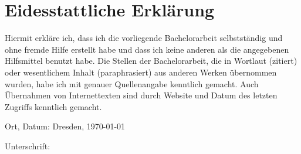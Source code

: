 \chapter*{Eidesstattliche Erklärung}

Hiermit erkläre ich, dass ich die vorliegende Bachelorarbeit selbstständig und ohne fremde Hilfe erstellt habe und dass ich keine anderen als die angegebenen Hilfsmittel benutzt habe. Die Stellen der Bachelorarbeit, die in Wortlaut (zitiert) oder wesentlichem Inhalt (paraphrasiert) aus anderen Werken übernommen wurden, habe ich mit genauer Quellenangabe kenntlich gemacht. Auch Übernahmen von Internettexten sind durch Website und Datum des letzten Zugriffs kenntlich gemacht.

\vspace{1cm}

Ort, Datum: Dresden, \today{}

Unterschrift: